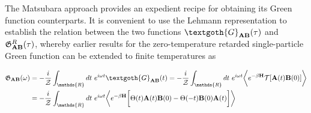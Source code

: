 The Matsubara approach provides an expedient recipe for obtaining its Green function counterparts. It is convenient to use the Lehmann representation to establish the relation between the two functions  $\textgoth{G}_{{\bf AB}}(\tau)$ and $\mathfrak{G}^R_{{\bf AB}}(\tau)$, whereby earlier results for the zero-temperature retarded single-particle Green function can be extended to finite temperatures as 

\begin{equation}
    \begin{split}
        \mathfrak{G}_{{\bf AB}}(\omega) &= - \frac{i}{\mathcal{Z}} \int_{\mathds{R}} dt \blanky e^{i\omega t}\textgoth{G}_{{\bf AB}}(t) = - \frac{i}{\mathcal{Z}} \int_{\mathds{R}} dt \blanky e^{i\omega t} \bigg \langle e^{-\beta {\bf H}} \mathcal{T} [{\bf A}(t) {\bf B}(0)] \bigg \rangle \\
        &= - \frac{i}{\mathcal{Z}} \int_{\mathds{R}} dt \blanky e^{i\omega t} \bigg \langle e^{-\beta {\bf H}} 
        \bigg[
        \Theta(t) {\bf A}(t) {\bf B}(0) - 
        \Theta(-t) {\bf B}(0) {\bf A}(t)
        \bigg] \bigg \rangle
    \end{split}
\end{equation}

